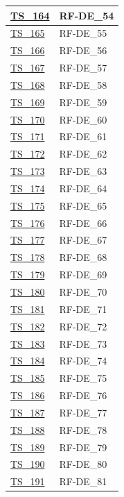 \begin{longtable}{|
    >{\raggedright\arraybackslash}p{} |
    >{\centering\arraybackslash}p{} |
    }
    \hyperlink{ts-164}{TS\_164} & RF-DE\_54 \\ \hline
    \hyperlink{ts-165}{TS\_165} & RF-DE\_55 \\ \hline
    \hyperlink{ts-166}{TS\_166} & RF-DE\_56 \\ \hline
    \hyperlink{ts-167}{TS\_167} & RF-DE\_57 \\ \hline
    \hyperlink{ts-168}{TS\_168} & RF-DE\_58 \\ \hline
    \hyperlink{ts-169}{TS\_169} & RF-DE\_59 \\ \hline
    \hyperlink{ts-170}{TS\_170} & RF-DE\_60 \\ \hline
    \hyperlink{ts-171}{TS\_171} & RF-DE\_61 \\ \hline
    \hyperlink{ts-172}{TS\_172} & RF-DE\_62 \\ \hline
    \hyperlink{ts-173}{TS\_173} & RF-DE\_63 \\ \hline
    \hyperlink{ts-174}{TS\_174} & RF-DE\_64 \\ \hline
    \hyperlink{ts-175}{TS\_175} & RF-DE\_65 \\ \hline
    \hyperlink{ts-176}{TS\_176} & RF-DE\_66 \\ \hline
    \hyperlink{ts-177}{TS\_177} & RF-DE\_67 \\ \hline
    \hyperlink{ts-178}{TS\_178} & RF-DE\_68 \\ \hline
    \hyperlink{ts-179}{TS\_179} & RF-DE\_69 \\ \hline
    \hyperlink{ts-180}{TS\_180} & RF-DE\_70 \\ \hline
    \hyperlink{ts-181}{TS\_181} & RF-DE\_71 \\ \hline
    \hyperlink{ts-182}{TS\_182} & RF-DE\_72 \\ \hline
    \hyperlink{ts-183}{TS\_183} & RF-DE\_73 \\ \hline
    \hyperlink{ts-184}{TS\_184} & RF-DE\_74 \\ \hline
    \hyperlink{ts-185}{TS\_185} & RF-DE\_75 \\ \hline
    \hyperlink{ts-186}{TS\_186} & RF-DE\_76 \\ \hline
    \hyperlink{ts-187}{TS\_187} & RF-DE\_77 \\ \hline
    \hyperlink{ts-188}{TS\_188} & RF-DE\_78 \\ \hline
    \hyperlink{ts-189}{TS\_189} & RF-DE\_79 \\ \hline
    \hyperlink{ts-190}{TS\_190} & RF-DE\_80 \\ \hline
    \hyperlink{ts-191}{TS\_191} & RF-DE\_81 \\ \hline

\end{longtable}
